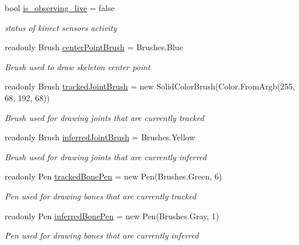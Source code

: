 \begin{DoxyCompactItemize}
bool \hyperlink{classUTKinectSkeletonMovementDetector_1_1MainWindow_a8b1de4d1921f6154890c30a8729f4f47}{is\-\_\-observing\-\_\-live} = false
\begin{DoxyCompactList}\small\item\em status of kinect sensors activity \end{DoxyCompactList}\item 
readonly Brush \hyperlink{classUTKinectSkeletonMovementDetector_1_1MainWindow_a8bfd26f98eba97fd468e4010f8022cb3}{center\-Point\-Brush} = Brushes.\-Blue
\begin{DoxyCompactList}\small\item\em Brush used to draw skeleton center point \end{DoxyCompactList}\item 
readonly Brush \hyperlink{classUTKinectSkeletonMovementDetector_1_1MainWindow_a32df891deb0a6cbcb5ce39a10b360640}{tracked\-Joint\-Brush} = new Solid\-Color\-Brush(Color.\-From\-Argb(255, 68, 192, 68))
\begin{DoxyCompactList}\small\item\em Brush used for drawing joints that are currently tracked \end{DoxyCompactList}\item 
readonly Brush \hyperlink{classUTKinectSkeletonMovementDetector_1_1MainWindow_a31afb96aa9574c7c64153506a5a1cc3e}{inferred\-Joint\-Brush} = Brushes.\-Yellow
\begin{DoxyCompactList}\small\item\em Brush used for drawing joints that are currently inferred \end{DoxyCompactList}\item 
readonly Pen \hyperlink{classUTKinectSkeletonMovementDetector_1_1MainWindow_a063c1ae116063d9f00ecec5c56157126}{tracked\-Bone\-Pen} = new Pen(Brushes.\-Green, 6)
\begin{DoxyCompactList}\small\item\em Pen used for drawing bones that are currently tracked \end{DoxyCompactList}\item 
readonly Pen \hyperlink{classUTKinectSkeletonMovementDetector_1_1MainWindow_a93d63abebf74565cfd10da87ced63146}{inferred\-Bone\-Pen} = new Pen(Brushes.\-Gray, 1)
\begin{DoxyCompactList}\small\item\em Pen used for drawing bones that are currently inferred \end{DoxyCompactList}\item 

\end{DoxyCompactItemize}
